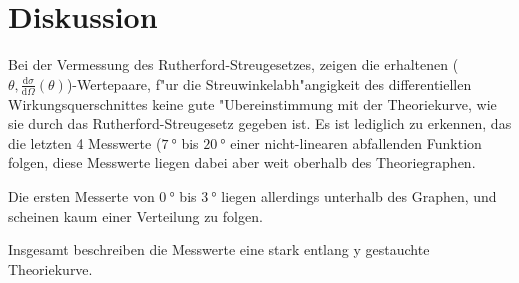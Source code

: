 \section{Diskussion}
\label{sec:Diskussion}
  Bei der Vermessung des Rutherford-Streugesetzes, zeigen die erhaltenen ($\theta,\frac{\text{d}\sigma}{\text{d}\Omega}(\theta)$)-Wertepaare, f"ur die Streuwinkelabh"angigkeit des differentiellen Wirkungsquerschnittes keine gute "Ubereinstimmung mit der Theoriekurve, wie sie durch das Rutherford-Streugesetz gegeben ist.
  Es ist lediglich zu erkennen, das die letzten 4 Messwerte ($\SI{7}{\degree}$ bis $\SI{20}{\degree}$ einer nicht-linearen abfallenden Funktion folgen, diese Messwerte liegen dabei aber weit oberhalb des Theoriegraphen.

  Die ersten Messerte von $\SI{0}{\degree}$ bis $\SI{3}{\degree}$ liegen allerdings unterhalb des Graphen, und scheinen kaum einer Verteilung zu folgen.

  Insgesamt beschreiben die Messwerte eine stark entlang y gestauchte Theoriekurve.
